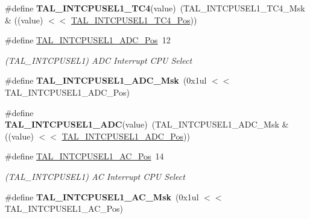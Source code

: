 \begin{DoxyCompactItemize}
\item 
\hypertarget{group___s_a_m_l21___t_a_l_gab3a5657d54a9ff0f585ee8fc3792e643}{}\#define {\bfseries T\+A\+L\+\_\+\+I\+N\+T\+C\+P\+U\+S\+E\+L1\+\_\+\+T\+C4}(value)~(T\+A\+L\+\_\+\+I\+N\+T\+C\+P\+U\+S\+E\+L1\+\_\+\+T\+C4\+\_\+\+Msk \& ((value) $<$$<$ \hyperlink{group___s_a_m_l21___t_a_l_ga425a6efc1066c74524341cb740b39f06}{T\+A\+L\+\_\+\+I\+N\+T\+C\+P\+U\+S\+E\+L1\+\_\+\+T\+C4\+\_\+\+Pos}))\label{group___s_a_m_l21___t_a_l_gab3a5657d54a9ff0f585ee8fc3792e643}

\item 
\hypertarget{group___s_a_m_l21___t_a_l_ga0106176a48133fc2e54073a17f7ae095}{}\#define \hyperlink{group___s_a_m_l21___t_a_l_ga0106176a48133fc2e54073a17f7ae095}{T\+A\+L\+\_\+\+I\+N\+T\+C\+P\+U\+S\+E\+L1\+\_\+\+A\+D\+C\+\_\+\+Pos}~12\label{group___s_a_m_l21___t_a_l_ga0106176a48133fc2e54073a17f7ae095}

\begin{DoxyCompactList}\small\item\em (T\+A\+L\+\_\+\+I\+N\+T\+C\+P\+U\+S\+E\+L1) A\+D\+C Interrupt C\+P\+U Select \end{DoxyCompactList}\item 
\hypertarget{group___s_a_m_l21___t_a_l_ga9f4154823d126f5aa24c8e4a1d02a311}{}\#define {\bfseries T\+A\+L\+\_\+\+I\+N\+T\+C\+P\+U\+S\+E\+L1\+\_\+\+A\+D\+C\+\_\+\+Msk}~(0x1ul $<$$<$ T\+A\+L\+\_\+\+I\+N\+T\+C\+P\+U\+S\+E\+L1\+\_\+\+A\+D\+C\+\_\+\+Pos)\label{group___s_a_m_l21___t_a_l_ga9f4154823d126f5aa24c8e4a1d02a311}

\item 
\hypertarget{group___s_a_m_l21___t_a_l_gacbbd9c861ee5036276686efac2849b5e}{}\#define {\bfseries T\+A\+L\+\_\+\+I\+N\+T\+C\+P\+U\+S\+E\+L1\+\_\+\+A\+D\+C}(value)~(T\+A\+L\+\_\+\+I\+N\+T\+C\+P\+U\+S\+E\+L1\+\_\+\+A\+D\+C\+\_\+\+Msk \& ((value) $<$$<$ \hyperlink{group___s_a_m_l21___t_a_l_ga0106176a48133fc2e54073a17f7ae095}{T\+A\+L\+\_\+\+I\+N\+T\+C\+P\+U\+S\+E\+L1\+\_\+\+A\+D\+C\+\_\+\+Pos}))\label{group___s_a_m_l21___t_a_l_gacbbd9c861ee5036276686efac2849b5e}

\item 
\hypertarget{group___s_a_m_l21___t_a_l_ga6e4b11427dc799b52be28434544ac8b9}{}\#define \hyperlink{group___s_a_m_l21___t_a_l_ga6e4b11427dc799b52be28434544ac8b9}{T\+A\+L\+\_\+\+I\+N\+T\+C\+P\+U\+S\+E\+L1\+\_\+\+A\+C\+\_\+\+Pos}~14\label{group___s_a_m_l21___t_a_l_ga6e4b11427dc799b52be28434544ac8b9}

\begin{DoxyCompactList}\small\item\em (T\+A\+L\+\_\+\+I\+N\+T\+C\+P\+U\+S\+E\+L1) A\+C Interrupt C\+P\+U Select \end{DoxyCompactList}\item 
\hypertarget{group___s_a_m_l21___t_a_l_gaf8bb4d86920e6785311c2e71f81e460b}{}\#define {\bfseries T\+A\+L\+\_\+\+I\+N\+T\+C\+P\+U\+S\+E\+L1\+\_\+\+A\+C\+\_\+\+Msk}~(0x1ul $<$$<$ T\+A\+L\+\_\+\+I\+N\+T\+C\+P\+U\+S\+E\+L1\+\_\+\+A\+C\+\_\+\+Pos)\label{group___s_a_m_l21___t_a_l_gaf8bb4d86920e6785311c2e71f81e460b}


\end{DoxyCompactItemize}

